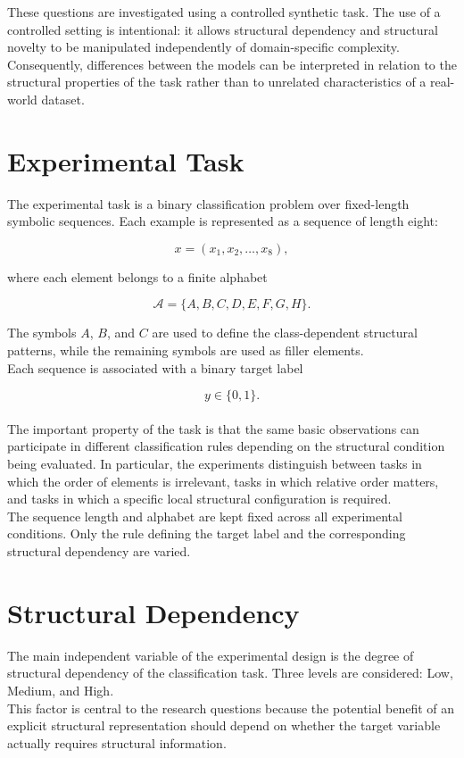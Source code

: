 \noindent
These questions are investigated using a controlled synthetic task. The use of a controlled setting is intentional: it allows structural dependency and structural novelty to be manipulated independently of domain-specific complexity. Consequently, differences between the models can be interpreted in relation to the structural properties of the task rather than to unrelated characteristics of a real-world dataset.

\section{Experimental Task}

\noindent
The experimental task is a binary classification problem over fixed-length symbolic sequences. Each example is represented as a sequence of length eight:

$$
x = (x_1,x_2,\ldots,x_8),
$$

where each element belongs to a finite alphabet

$$
\mathcal{A} = \{A,B,C,D,E,F,G,H\}.
$$

\noindent
The symbols $A$, $B$, and $C$ are used to define the class-dependent structural patterns, while the remaining symbols are used as filler elements.
\\
Each sequence is associated with a binary target label

$$
y \in \{0,1\}.
$$
\\
The important property of the task is that the same basic observations can participate in different classification rules depending on the structural condition being evaluated. In particular, the experiments distinguish between tasks in which the order of elements is irrelevant, tasks in which relative order matters, and tasks in which a specific local structural configuration is required.
\\
The sequence length and alphabet are kept fixed across all experimental conditions. Only the rule defining the target label and the corresponding structural dependency are varied.

\section{Structural Dependency}

\noindent
The main independent variable of the experimental design is the degree of structural dependency of the classification task. Three levels are considered: Low, Medium, and High.
\\
This factor is central to the research questions because the potential benefit of an explicit structural representation should depend on whether the target variable actually requires structural information.

